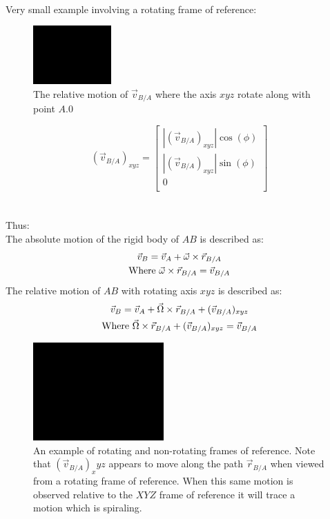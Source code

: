 \documentclass[11pt, a4paper]{article}
\begin{document}
\\
Very small example involving a rotating frame of reference:
\begin{figure}[]
  \centerline{\includegraphics[width=30mm]{images/placeholder.png}}
  \caption{The relative motion of $\vec{v}_{B/A}$ where the axis $xyz$ rotate along with point $A$.0}
\end{figure}
\begin{equation}
  (\vec{v}_{B/A})_{xyz} = 
  \begin{bmatrix}
    |(\vec{v}_{B/A})_{xyz}|\cos(\phi)\\
    |(\vec{v}_{B/A})_{xyz}|\sin(\phi)\\
    0\\
  \end{bmatrix}
\end{equation}\\
\\
Thus:\\
The absolute motion of the rigid body of $AB$ is described as:
\begin{gather}
  \vec{v}_B = \vec{v}_A + \vec{\omega} \times \vec{r}_{B/A}\\
  \text{Where } \vec{\omega} \times \vec{r}_{B/A} = \vec{v}_{B/A} \notag
\end{gather}
The relative motion of $AB$ with rotating axis $xyz$ is described as:
\begin{gather}
  \vec{v}_B = \vec{v}_A + \vec{\Omega} \times \vec{r}_{B/A} + (\vec{v}_{B/A})_{xyz}\\
  \text{Where } \vec{\Omega} \times \vec{r}_{B/A} + (\vec{v}_{B/A})_{xyz} = \vec{v}_{B/A} \notag
\end{gather}
\begin{figure}[h]
  \centerline{\includegraphics[width=50mm]{images/placeholder.png}}
  \caption{An example of rotating and non-rotating frames of reference. Note that $(\vec{v}_{B/A})_xyz$ appears to move along the path $\vec{r}_{B/A}$ when viewed from a rotating frame of reference. When this same motion is observed relative to the $XYZ$ frame of reference it will trace a motion which is spiraling.}
\end{figure}
\end{document}

